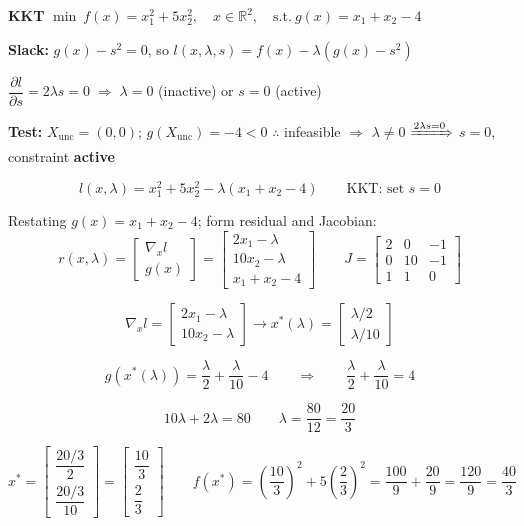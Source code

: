 \documentclass[10pt,a3paper]{article}
\begin{document}
\begin{minipage}[t]{0.50\linewidth}

\noindent\textbf{KKT} \quad $\min\ f(x) = x_1^2 + 5x_2^2,\quad x \in \mathbb{R}^2,\quad \text{s.t.}\ g(x) = x_1 + x_2 - 4$

\noindent\textbf{Slack:} $g(x) - s^2 = 0$, so $l(x,\lambda,s) = f(x) - \lambda(g(x) - s^2)$

\noindent$\dfrac{\partial l}{\partial s} = 2\lambda s = 0 \;\Rightarrow\; \lambda = 0$ (inactive) or $s = 0$ (active)

\noindent\textbf{Test:} $X_\text{unc} = (0,0)$;\; $g(X_\text{unc}) = -4 < 0$ \quad $\therefore$ infeasible $\Rightarrow$ $\lambda \neq 0$ \quad $\xRightarrow{2\lambda s=0}$ \quad $s = 0$, constraint \textbf{active}

\[
  l(x,\lambda) = x_1^2 + 5x_2^2 - \lambda(x_1 + x_2 - 4) \qquad \text{KKT: set } s=0
\]

\noindent Restating $g(x) = x_1 + x_2 - 4$; form residual and Jacobian:
\[
  r(x,\lambda) = \begin{bmatrix} \nabla_x l \\ g(x) \end{bmatrix}
               = \begin{bmatrix} 2x_1-\lambda \\ 10x_2-\lambda \\ x_1+x_2-4 \end{bmatrix}
  \qquad
  J = \begin{bmatrix} 2&0&-1\\0&10&-1\\1&1&0 \end{bmatrix}
\]

\[
  \nabla_x l = \begin{bmatrix} 2x_1 - \lambda \\ 10x_2 - \lambda \end{bmatrix}
  \rightarrow
  x^*(\lambda) = \begin{bmatrix} \lambda/2 \\ \lambda/10 \end{bmatrix}
\]

\[
  g\!\left(x^*(\lambda)\right) = \frac{\lambda}{2} + \frac{\lambda}{10} - 4
  \qquad\Rightarrow\qquad
  \frac{\lambda}{2} + \frac{\lambda}{10} = 4
\]

\[
  10\lambda + 2\lambda = 80 \qquad \lambda = \frac{80}{12} = \frac{20}{3}
\]

\[
  x^* = \begin{bmatrix} \dfrac{20/3}{2} \\[4pt] \dfrac{20/3}{10} \end{bmatrix}
       = \begin{bmatrix} \dfrac{10}{3} \\[4pt] \dfrac{2}{3} \end{bmatrix}
  \qquad
  f(x^*) = \left(\frac{10}{3}\right)^2 + 5\left(\frac{2}{3}\right)^2
          = \frac{100}{9} + \frac{20}{9}
          = \frac{120}{9}
          = \frac{40}{3}
\]

\end{minipage}\hfill
\end{document}
